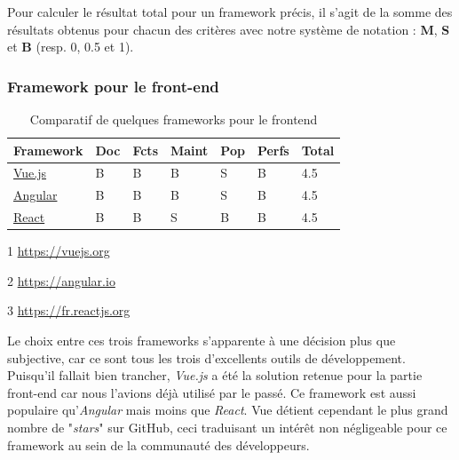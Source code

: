 Pour calculer le résultat total pour un framework précis, il s'agit de la somme des résultats obtenus pour chacun des critères avec notre système de notation : \textbf{M}, \textbf{S} et \textbf{B} (resp. 0, 0.5 et 1).

\subsubsection*{Framework pour le front-end}
\begin{table}[H]
    \centering
    \begin{threeparttable}
    \begin{tabular}{| l | l | l | l | l | l | l |}
    \hline
        Framework & Doc & Fcts & Maint & Pop & Perfs & Total \\
    \hline
        \href{https://vuejs.org}{Vue.js}\tnote{1} &
        B &  
        B &
        B &            
        S &              
        B &
        4.5 \\
    \hline
        \href{https://angular.io}{Angular}\tnote{2} &
        B &                
        B &   
        B &
        S &              
        B &       
        4.5 \\
    \hline
        \href{https://fr.reactjs.org}{React}\tnote{3} &
        B &                
        B &     
        S &
        B &              
        B &       
        4.5 \\  
    \hline
    \end{tabular}
    \begin{tablenotes}
        \item[1] \url{https://vuejs.org}
        \item[2] \url{https://angular.io}
        \item[3] \url{https://fr.reactjs.org}
    \end{tablenotes}
    \end{threeparttable}
    \caption{Comparatif de quelques frameworks pour le \gls{frontend}}
    \label{table:compFrameworksFrontend}
\end{table}

Le choix entre ces trois frameworks s'apparente à une décision plus que subjective, car ce sont tous les trois d'excellents outils de développement. \\

Puisqu'il fallait bien trancher, \textit{Vue.js} a été la solution retenue pour la partie front-end car nous l'avions déjà utilisé par le passé. Ce framework est aussi populaire qu'\textit{Angular} mais moins que \textit{React}. Vue détient cependant le plus grand nombre de "\textit{stars}" sur GitHub, ceci traduisant un intérêt non négligeable pour ce framework au sein de la communauté des développeurs.\\

